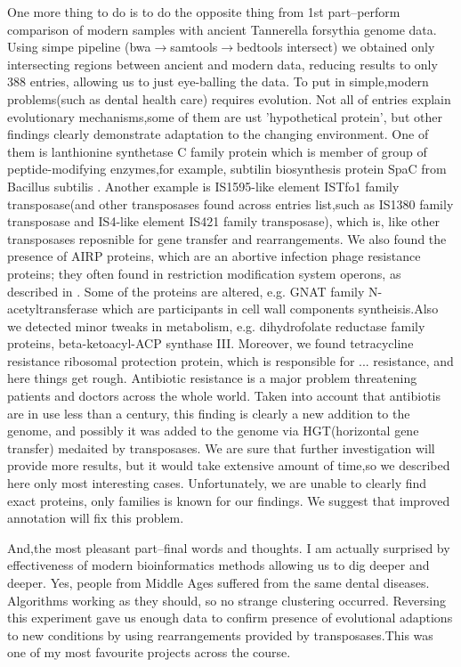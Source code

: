 \documentclass{article}
\begin{document}
One more thing to do is to do the opposite thing from 1st part--perform comparison of modern samples with ancient Tannerella forsythia genome data. Using simpe pipeline (bwa$\rightarrow$samtools$\rightarrow$bedtools intersect) we obtained only intersecting regions between ancient and modern data, reducing results to only 388 entries, allowing us to just eye-balling the data. To put in simple,modern problems(such as dental health care) requires evolution. Not all of entries explain evolutionary mechanisms,some of them are ust 'hypothetical protein', but other findings clearly demonstrate adaptation to the changing environment. One of them is lanthionine synthetase C family protein which is member of group of peptide-modifying enzymes,for example, subtilin biosynthesis protein SpaC from Bacillus subtilis \cite{1}. Another example is IS1595-like element ISTfo1 family transposase(and other transposases found across entries list,such as IS1380 family transposase and IS4-like element IS421 family transposase), which is, like other transposases reposnible for gene transfer and rearrangements. We also found the presence of AIRP proteins, which are an abortive infection phage resistance proteins; they often found in restriction modification system operons, as described in \cite{2}. Some of the proteins are altered, e.g. GNAT family N-acetyltransferase which are participants in cell wall components syntheisis.Also we detected minor tweaks in metabolism, e.g. dihydrofolate reductase family proteins, beta-ketoacyl-ACP synthase III. Moreover, we found tetracycline resistance ribosomal protection protein, which is responsible for ... resistance, and here things get rough. Antibiotic resistance is a major problem threatening patients and doctors across the whole world. Taken into account that antibiotis are in use less than a century, this finding is clearly a new addition to the genome, and possibly it was added to the genome via HGT(horizontal gene transfer) medaited by transposases. We are sure that further investigation will provide more results, but it would take extensive amount of time,so we described here only most interesting cases. Unfortunately, we are unable to clearly find exact proteins, only families is known for our findings. We suggest that improved annotation will fix this problem.


And,the most pleasant part--final words and thoughts. I am actually surprised by effectiveness of modern bioinformatics methods allowing us to dig deeper and deeper. Yes, people from Middle Ages suffered from the same dental diseases. Algorithms working as they should, so no strange clustering occurred. Reversing this experiment gave us enough data to confirm presence of evolutional adaptions to new conditions by using rearrangements provided by transposases.This was one of my most favourite projects across the course.
\end{document}
